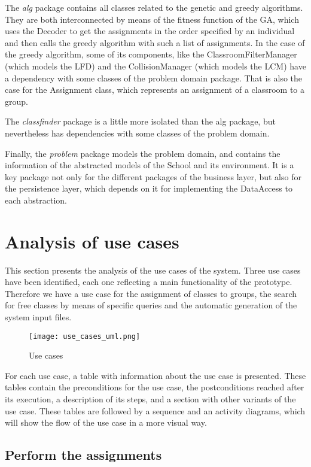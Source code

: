 The \textit{alg} package contains all classes related to the genetic and greedy algorithms. They are both interconnected by means of the fitness function of the GA, which uses the Decoder to get the assignments in the order specified by an individual and then calls the greedy algorithm with such a list of assignments. In the case of the greedy algorithm, some of its components, like the ClassroomFilterManager (which models the LFD) and the CollisionManager (which models the LCM) have a dependency with some classes of the problem domain package. That is also the case for the Assignment class, which represents an assignment of a classroom to a group.

The \textit{classfinder} package is a little more isolated than the alg package, but nevertheless has dependencies with some classes of the problem domain.

Finally, the \textit{problem} package models the problem domain, and contains the information of the abstracted models of the School and its environment. It is a key package not only for the different packages of the business layer, but also for the persistence layer, which depends on it for implementing the DataAccess to each abstraction.


\section{Analysis of use cases}

This section presents the analysis of the use cases of the system. Three use cases have been identified, each one reflecting a main functionality of the prototype. Therefore we have a use case for the assignment of classes to groups, the search for free classes by means of specific queries and the automatic generation of the system input files.

\begin{figure}[H]
    \caption{Use cases}
  \centering
  \texttt{[image: use\_cases\_uml.png]}
\end{figure}

For each use case, a table with information about the use case is presented. These tables contain the preconditions for the use case, the postconditions reached after its execution, a description of its steps, and a section with other variants of the use case. These tables are followed by a sequence and an activity diagrams, which will show the flow of the use case in a more visual way.

\subsection{Perform the assignments}

